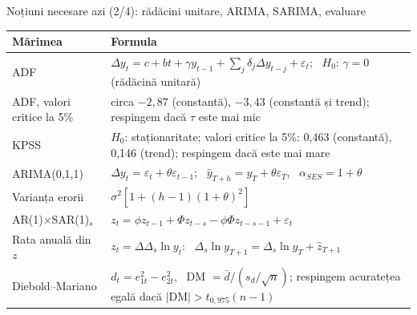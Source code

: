 \begin{frame}{Noțiuni necesare azi (2/4): rădăcini unitare, ARIMA, SARIMA, evaluare}
\itemsize{\small}
{\renewcommand{\arraystretch}{1.3}\begin{center}
\footnotesize
\begin{tabular}{l>{\raggedright\arraybackslash}p{9.4cm}}
\toprule
\textbf{Mărimea} & \textbf{Formula} \\
\midrule
ADF & $\Delta y_t = c + bt + \gamma y_{t-1} + \sum_j\delta_j\Delta y_{t-j} + \varepsilon_t$; \ $H_0$: $\gamma = 0$ (rădăcină unitară) \\
ADF, valori critice la 5\% & circa $-2{,}87$ (constantă), $-3{,}43$ (constantă și trend); respingem dacă $\tau$ este mai mic \\
KPSS & $H_0$: staționaritate; valori critice la 5\%: 0,463 (constantă), 0,146 (trend); respingem dacă este mai mare \\
ARIMA(0,1,1) & $\Delta y_t = \varepsilon_t + \theta\varepsilon_{t-1}$; \ $\hat y_{T+h} = y_T + \theta\varepsilon_T$, \ $\alpha_{SES} = 1 + \theta$ \\
Varianța erorii & $\sigma^2[1 + (h - 1)(1 + \theta)^2]$ \\
AR(1)$\times$SAR(1)$_s$ & $z_t = \phi z_{t-1} + \Phi z_{t-s} - \phi\Phi z_{t-s-1} + \varepsilon_t$ \\
Rata anuală din $z$ & $z_t = \Delta\Delta_s\ln y_t$: \ $\Delta_s\ln y_{T+1} = \Delta_s\ln y_T + \hat z_{T+1}$ \\
Diebold--Mariano & $d_t = e_{1t}^2 - e_{2t}^2$, \ DM $= \bar d/(s_d/\sqrt{n})$; respingem acuratețea egală dacă $|\mathrm{DM}| > t_{0{,}975}(n - 1)$ \\
\bottomrule
\end{tabular}
\end{center}
}
\end{frame}

